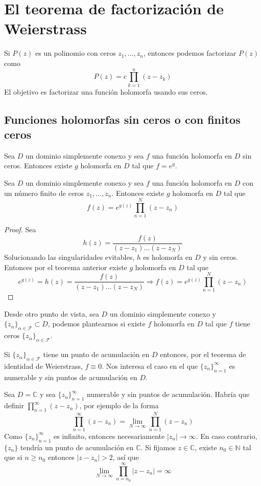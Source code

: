 \chapter{El teorema de factorización de Weierstrass}
Si $P(z)$ es un polinomio con ceros $z_1, \dots, z_n$, entonces podemos factorizar $P(z)$ como
$$P(z) = c\prod_{k=1}^n (z-z_k)$$
El objetivo es factorizar una función holomorfa usando sus ceros.

\section{Funciones holomorfas sin ceros o con finitos ceros}
\begin{theorem}
    Sea $D$ un dominio simplemente conexo y sea $f$ una función holomorfa en $D$ sin ceros.
    Entonces existe $g$ holomorfa en $D$ tal que $f = e^g$.
\end{theorem}

\begin{theorem}
    Sea $D$ un dominio simplemente conexo y sea $f$ una función holomorfa en $D$ con un número finito de ceros $z_1, \dots, z_n$.
    Entonces existe $g$ holomorfa en $D$ tal que
    $$f(z) = e^{g(z)} \prod_{n=1}^N (z-z_n)$$
\end{theorem}

\begin{proof}
    Sea
    $$h(z) = \frac{f(z)}{(z-z_1)\dots(z-z_N)}$$
    Solucionando las singularidades evitables, $h$ es holomorfa en $D$ y sin ceros.
    Entonces por el teorema anterior existe $g$ holomorfa en $D$ tal que
    $$e^{g(z)} = h(z) = \frac{f(z)}{(z-z_1)\dots(z-z_N)} \Rightarrow f(z) = e^{g(z)} \prod_{n=1}^N (z-z_n)$$
\end{proof}

Desde otro punto de vista, sea $D$ un dominio simplemente conexo y $\{z_\alpha\}_{\alpha \in \mathcal{F}} \subset D$, podemos plantearnos si existe $f$ holomorfa en $D$ tal que $f$ tiene ceros $\{z_\alpha\}_{\alpha \in \mathcal{F}}$.

Si $\{z_\alpha\}_{\alpha \in \mathcal{F}}$ tiene un punto de acumulación en $D$ entonces, por el teorema de identidad de Weierstrass, $f \equiv 0$.
Nos interesa el caso en el que $\{z_n\}_{n=1}^\infty$ es numerable y sin puntos de acumulación en $D$.

Sea $D = \mathbb{C}$ y sea $\{z_n\}_{n=1}^\infty$ numerable y sin puntos de acumulación.
Habría que definir $\prod_{n=1}^\infty (z-z_n)$, por ejemplo de la forma
$$\prod_{n=1}^\infty (z-z_n) = \lim_{N \to \infty} \prod_{n=1}^N (z-z_n)$$
Como $\{z_n\}_{n=1}^\infty$ es infinito, entonces necesariamente $|z_n| \to \infty$.
En caso contrario, $\{z_n\}$ tendría un punto de acumulación en $\mathbb{C}$.
Si fijamos $z \in \mathbb{C}$, existe $n_0 \in \mathbb{N}$ tal que si $n \geq n_0$ entonces $|z-z_n| > 2$, así que
$$\lim_{N \to \infty} \prod_{n=n_0}^\infty |z-z_n| = \infty$$

